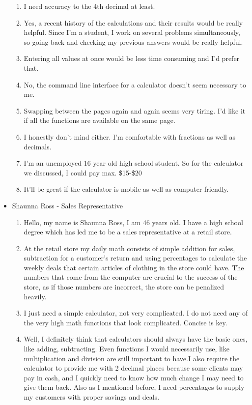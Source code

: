 \documentclass[titlepage]{article}
\begin{document}
\begin{itemize}
\begin{enumerate}
                        \item I need accuracy to the 4th decimal at least.
                        \item Yes, a recent history of the calculations and their results would be really helpful. Since I’m a student, I work on several problems simultaneously, so going back and checking my previous answers would be really helpful.
                        \item Entering all values at once would be less time consuming and I’d prefer that.
                        \item No, the command line interface for a calculator doesn’t seem necessary to me.
                        \item Swapping between the pages again and again seems very tiring. I’d like it if all the functions are available on the same page.
                        \item I honestly don’t mind either. I’m comfortable with fractions as well as decimals.
                        \item I’m an unemployed 16 year old high school student. So for the calculator we discussed, I could pay max. \$15-\$20
                        \item It’ll be great if the calculator is mobile as well as computer friendly.
                    \end{enumerate}
                \item Shaunna Ross - Sales Representative
                    \begin{enumerate}
                        \item Hello, my name is Shaunna Ross, I am 46 years old. I have a high school degree which has led me to be a sales representative at a retail store.
                        \item At the retail store my daily math consists of simple addition for sales, subtraction for a customer’s return and using percentages to calculate the weekly deals that certain articles of clothing in the store could have. The numbers that come from the computer are crucial to the success of the store, as if those numbers are incorrect, the store can be penalized heavily.
                        \item I just need a simple calculator, not very complicated. I do not need any of the very high math functions that look complicated. Concise is key.
                        \item Well, I definitely think that calculators should always have the basic ones, like adding, subtracting. Even functions I would necessarily use, like multiplication and division are still important to have.I also require the calculator to provide me with 2 decimal places because some clients may pay in cash, and I quickly need to know how much change I may need to give them back. Also as I mentioned before, I need percentages to supply my customers with proper savings and deals.

\end{enumerate}
\end{itemize}
\end{document}
